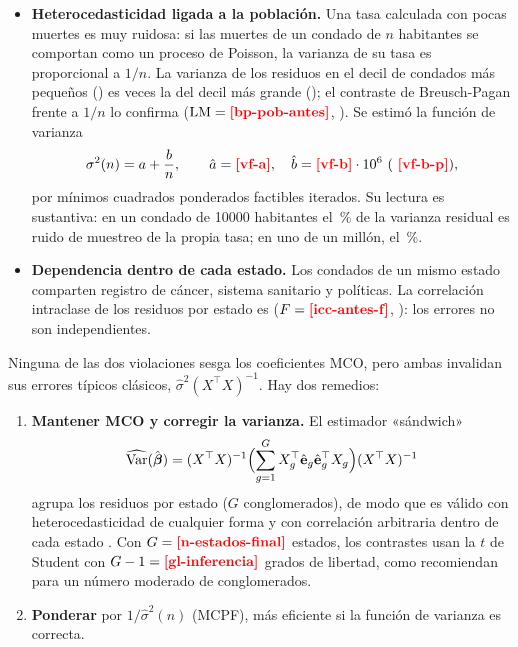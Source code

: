 \begin{itemize}
  \item \textbf{Heterocedasticidad ligada a la población.} Una tasa calculada con pocas muertes es
  muy ruidosa: si las muertes de un condado de $n$ habitantes se comportan como un proceso de
  Poisson, la varianza de su tasa es proporcional a $1/n$. La varianza de los residuos en el
  decil de condados más pequeños () es  veces la del decil
  más grande (); el contraste de Breusch-Pagan frente a $1/n$ lo confirma
  ($\mathrm{LM}=\res{bp-pob-antes}$, ). Se estimó la función de varianza
  \[
  \sigma^2(n)=a+\frac{b}{n},\qquad \hat a=\res{vf-a},\quad \hat b=\res{vf-b}\cdot10^{6}\ \text{(\res{vf-b-p})},
  \]
  por mínimos cuadrados ponderados factibles iterados. Su lectura es sustantiva: en un condado de
  \num{10000} habitantes el \,\% de la varianza residual es ruido de
  muestreo de la propia tasa; en uno de un millón, el \,\%.
  \item \textbf{Dependencia dentro de cada estado.} Los condados de un mismo estado comparten
  registro de cáncer, sistema sanitario y políticas. La correlación intraclase de los residuos por
  estado es  ($F=\res{icc-antes-f}$, ): los errores no son
  independientes.
\end{itemize}


Ninguna de las dos violaciones sesga los coeficientes MCO, pero ambas invalidan sus errores
típicos clásicos, $\hat\sigma^2(X^{\top}X)^{-1}$. Hay dos remedios:
\begin{enumerate}
  \item \textbf{Mantener MCO y corregir la varianza.} El estimador «sándwich»
  \[
  \widehat{\operatorname{Var}}(\hat{\boldsymbol\beta})=(X^{\top}X)^{-1}
  \Bigl(\sum_{g=1}^{G}X_g^{\top}\hat{\mathbf e}_g\hat{\mathbf e}_g^{\top}X_g\Bigr)(X^{\top}X)^{-1}
  \]
  agrupa los residuos por estado ($G$ conglomerados), de modo que es válido con
  heterocedasticidad de cualquier forma y con correlación arbitraria dentro de cada estado
  \parencite{white1980,cameron2015}. Con $G=\res{n-estados-final}$ estados, los contrastes usan la
  $t$ de Student con $G-1=\res{gl-inferencia}$ grados de libertad, como recomiendan
  \textcite{cameron2015} para un número moderado de conglomerados.
  \item \textbf{Ponderar} por $1/\hat\sigma^2(n)$ (MCPF), más eficiente si la función de varianza es
  correcta.
\end{enumerate}

